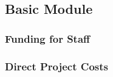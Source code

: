  \subsection{Basic Module}

\subsubsection{Funding for Staff}
\label{sec:staff}



\subsubsection{Direct Project Costs}



\label{sec:costs:travel}

